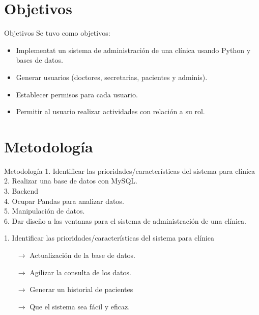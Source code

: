 \documentclass[10pt]{beamer}
\begin{document}
\section{Objetivos}
\begin{frame}{Objetivos}
    Se tuvo como objetivos: \\
    \begin{itemize}
        \item Implementat un sistema de 
        administración de una clínica usando Python y bases de datos. \\
        \item Generar usuarios (doctores, secretarias,  pacientes y adminis). \\
        \item Establecer permisos para cada usuario. \\ 
        \item Permitir al usuario realizar actividades con relación a su rol. \\
    \end{itemize}
    
\end{frame}

\section{Metodología}
\begin{frame}[fragile]{Metodología}
1. Identificar las prioridades/características del sistema para clínica \\
2. Realizar una base de datos con MySQL. \\
3. Backend \\
4. Ocupar Pandas para analizar datos. \\
5. Manipulación de datos. \\
6. Dar diseño a las ventanas para el sistema de administración de una clínica. \\
\end{frame}

\begin{frame}{1. Identificar las prioridades/características del sistema para clínica}
 \\
\begin{itemize}
    \item[$\rightarrow$] Actualización de la base de datos. \\
    \item[$\rightarrow$] Agilizar la consulta de los datos. \\
     \item[$\rightarrow$] Generar un historial de pacientes \\
    \item[$\rightarrow$] Que el sistema sea fácil y eficaz. \\
\end{itemize}
\end{frame}
\end{document}
